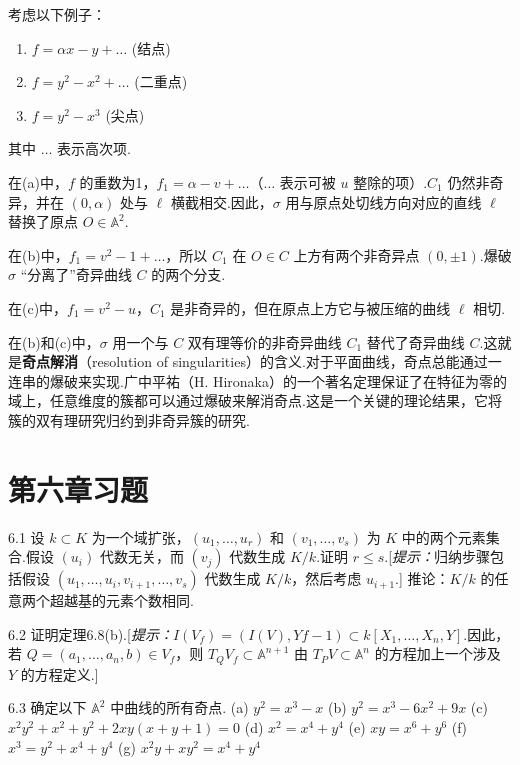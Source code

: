 考虑以下例子：
\begin{enumerate}
    \item[(a)] \(f = \alpha x - y + \dots\) (结点)
    \item[(b)] \(f = y^2 - x^2 + \dots\) (二重点)
    \item[(c)] \(f = y^2 - x^3\) (尖点)
\end{enumerate}
其中 \(\dots\) 表示高次项.

在(a)中，\(f\) 的重数为1，\(f_1 = \alpha - v + \dots\)（\(\dots\) 表示可被 \(u\) 整除的项）.\(C_1\) 仍然非奇异，并在 \((0, \alpha)\) 处与 \(\ell\) 横截相交.因此，\(\sigma\) 用与原点处切线方向对应的直线 \(\ell\) 替换了原点 \(O \in \mathbb{A}^2\).

在(b)中，\(f_1 = v^2 - 1 + \dots\)，所以 \(C_1\) 在 \(O \in C\) 上方有两个非奇异点 \((0, \pm 1)\).爆破 \(\sigma\) “分离了”奇异曲线 \(C\) 的两个分支.

在(c)中，\(f_1 = v^2 - u\)，\(C_1\) 是非奇异的，但在原点上方它与被压缩的曲线 \(\ell\) 相切.

在(b)和(c)中，\(\sigma\) 用一个与 \(C\) 双有理等价的非奇异曲线 \(C_1\) 替代了奇异曲线 \(C\).这就是\textbf{奇点解消}（resolution of singularities）的含义.对于平面曲线，奇点总能通过一连串的爆破来实现.广中平祐（H. Hironaka）的一个著名定理保证了在特征为零的域上，任意维度的簇都可以通过爆破来解消奇点.这是一个关键的理论结果，它将簇的双有理研究归约到非奇异簇的研究.

\section{第六章习题}

6.1 设 \(k \subset K\) 为一个域扩张，\((u_1, \ldots, u_r)\) 和 \((v_1, \ldots, v_s)\) 为 \(K\) 中的两个元素集合.假设 \((u_i)\) 代数无关，而 \((v_j)\) 代数生成 \(K/k\).证明 \(r \le s\).[\textit{提示：}归纳步骤包括假设 \((u_1, \ldots, u_i, v_{i+1}, \ldots, v_s)\) 代数生成 \(K/k\)，然后考虑 \(u_{i+1}\).] 推论：\(K/k\) 的任意两个超越基的元素个数相同.

6.2 证明定理6.8(b).[\textit{提示：}\(I(V_f) = (I(V), Yf-1) \subset k[X_1, \ldots, X_n, Y]\).因此，若 \(Q = (a_1, \ldots, a_n, b) \in V_f\)，则 \(T_Q V_f \subset \mathbb{A}^{n+1}\) 由 \(T_P V \subset \mathbb{A}^n\) 的方程加上一个涉及 \(Y\) 的方程定义.]

6.3 确定以下 \(\mathbb{A}^2\) 中曲线的所有奇点.
(a) \(y^2 = x^3 - x\)
(b) \(y^2 = x^3 - 6x^2 + 9x\)
(c) \(x^2 y^2 + x^2 + y^2 + 2xy(x+y+1) = 0\)
(d) \(x^2 = x^4 + y^4\)
(e) \(xy = x^6 + y^6\)
(f) \(x^3 = y^2 + x^4 + y^4\)
(g) \(x^2 y + xy^2 = x^4 + y^4\)

